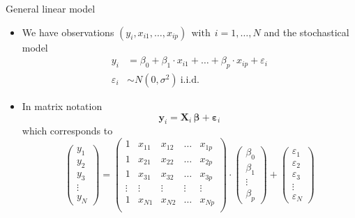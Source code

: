 \documentclass[aspectratio=169]{beamer}
\newcommand{\vect}[1]{\mathbf{#1}}
\newcommand{\mat}[1]{\mathbf{#1}}
\newcommand{\gvect}[1]{\boldsymbol{#1}}
\begin{document}
\begin{frame}{General linear model}
  \begin{itemize}
    \item We have observations $(y_i, x_{i1}, \ldots, x_{ip}) ~~\text{with}~~ i = 1, \ldots, N$
and the stochastical model
\begin{align*}
  y_i & = \beta_0 + \beta_1 \cdot x_{i1} + \ldots + \beta_p \cdot x_{ip} +
        \varepsilon_i \\
  \varepsilon_i & \sim N (0, \sigma^2)~\text{i.i.d.}
\end{align*}

\vspace{-.4cm}
\item In matrix notation
\[
  \vect{y}_i = \mat{X}_i \, \gvect{\beta} + \gvect{\varepsilon}_i
\]
which corresponds to
\[
  \begin{pmatrix}
    y_1 \\
    y_2 \\
    y_3 \\
    \vdots \\
    y_N
  \end{pmatrix} = 
  \begin{pmatrix}
    1 & x_{11} & x_{12} & \dots & x_{1p} \\
    1 & x_{21} & x_{22} & \dots & x_{2p} \\
    1 & x_{31} & x_{32} & \dots & x_{3p} \\
    \vdots & \vdots & \vdots & \vdots & \vdots \\
    1 & x_{N1} & x_{N2} & \dots & x_{Np} \\
  \end{pmatrix} \cdot
  \begin{pmatrix}
    \beta_0 \\
    \beta_1 \\
    \vdots \\
    \beta_p
  \end{pmatrix} +
  \begin{pmatrix}
    \varepsilon_1 \\
    \varepsilon_2 \\
    \varepsilon_3 \\
    \vdots \\
    \varepsilon_N
  \end{pmatrix}
\]
  \end{itemize}
\end{frame}
\end{document}
